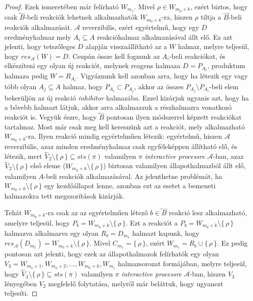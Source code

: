 \documentclass[12pt]{article}
\theoremstyle{definition}
\theoremstyle{remark}
\theoremstyle{plain}
\theoremstyle{remark}
\theoremstyle{plain}
\newcommand{\forwardhat}{\overset{\rightharpoonup}}
\newcommand{\backwardhat}{\overset{\leftharpoonup}}
\newcommand{\res}{\textit{res}}
\begin{document}
\begin{proof}
            
        Ezek ismeretében már felírható $W_{m_{1}}$. Mivel $\rho \in W_{m_{0} + k}$, ezért biztos, hogy csak $\backwardhat B$-beli reakciók lehetnek alkalmazhatók $W_{m_{0} + k}$-ra, hiszen $\rho$ tiltja a $\forwardhat B$-beli reakciók alkalmazását. $\mathscr{A}$ reverzibilis, ezért egyértelmű, hogy egy $D$ eredményhalmaz mely $A_{i} \subseteq A$ reakcióhalmaz alkalmazásával állt elő. Ez azt jelenti, hogy tetszőleges $D$ alapján visszaállítható az a $W$ halmaz, melyre teljesül, hogy $\res_{\mathscr{A}}(W)=D$. Csupán össze kell fognunk az $A_{i}$-beli reakciókat, és elkészíteni egy olyan új reakciót, melynek reagens halmaza $D = P_{A_{i}}$, produktum halmaza pedig $W = R_{A_{i}}$. Vigyáznunk kell azonban arra, hogy ha létezik egy vagy több olyan $A_{j} \subseteq A$ halmaz, hogy $P_{A_{i}} \subset P_{A_{j}}$, akkor az összes $P_{A_{j}} \setminus P_{A_{i}}$-beli elem bekerüljön az új reakció \textit{inhibitor} halmazába. Ezzel kizárjuk ugyanis azt, hogy ha a bővebb halmazt látjuk, akkor arra alkalmazzuk a részhalmazra vonatkozó reakciót is. Vegyük észre, hogy $\backwardhat B$ pontosan ilyen módszerrel képzett reakciókat tartalmaz. Most már csak meg kell keresnünk azt a reakciót, mely alkalmazható $W_{m_{0} + k}$-ra. Ilyen reakció mindig egyértelműen létezik: egyértelmű, hiszen $\mathscr{A}$ reverzibilis, azaz minden eredményhalmaz csak egyféleképpen állítható elő, és létezik, mert $\backwardhat V_{2} \setminus \{ \, \rho \, \} \subseteq \textit{sts}(\pi)$ valamilyen $\pi$ \textit{interactive processre} $\mathscr{A}$-ban, azaz $\backwardhat V_{2} \setminus \{\,\rho\,\}$ első eleme ($W_{m_{0} + k} \setminus \{\,\rho\,\}$) biztosan valamilyen állapothalmazból állt elő, valamilyen $A$-beli reakciók alkalmazásával. Az jelenthetne problémát, ha $W_{m_{0} + k} \setminus \{\,\rho\,\}$ egy kezdőállapot lenne, azonban ezt az esetet a bemeneti halmazokra tett megszorítások kizárják.

        Tehát $W_{m_{0} + k}$-ra csak az az egyértelműen létező $b \in \backwardhat B$ reakció lesz alkalmazható, amelyre teljesül, hogy $P_{b} = W_{m_{0} + k} \setminus \{ \,  \rho \, \}$.  Ezt a reakciót a $P_{b} = W_{m_{0} + k} \setminus \{ \,  \rho \, \}$ halmazva alkalmazva egy olyan $R_{b} = D_{m_{1}}$ halmazt kapunk, hogy $\res_{\mathscr{A}}(D_{m_{1}}) = W_{m_{0} + k} \setminus \{ \,  \rho \, \}$. Mivel $C_{m_{1}} = \{\,\rho\,\}$, ezért $W_{m_{1}} = R_{b} \cup \{ \, \rho \, \}$. Ez pedig pontosan azt jelenti, hogy ezek az állapothalmazok felírhatók egy olyan $V_{3} = W_{m_{0} + 1}, W_{m_{0} + 2}, \ldots, W_{m_{0} + k}, W_{m_{1}}$ halmazsorozat formájában, melyre teljesül, hogy $\backwardhat V_{3} \setminus \{ \,  \rho \, \} \subseteq \textit{sts}(\pi)$ valamilyen $\pi$ \textit{interactive processre} $\mathscr{A}$-ban, hiszen $V_{3}$ lényegében $V_{2}$ megfelelő folytatása, melyről már beláttuk, hogy ugyanezt teljesíti.


\end{proof}
\end{document}
